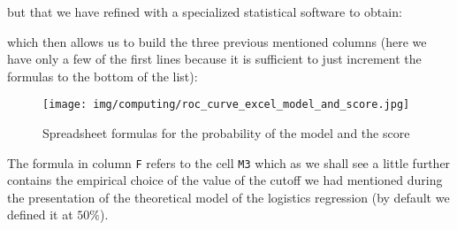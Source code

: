 	but that we have refined with a specialized statistical software to obtain:
	
	which then allows us to build the three previous mentioned columns (here we have only a few of the first lines because it is sufficient to just increment the formulas to the bottom of the list):
	\begin{figure}[H]
		\centering
		\texttt{[image: img/computing/roc\_curve\_excel\_model\_and\_score.jpg]}
		\caption{Spreadsheet formulas for the probability of the model and the score}
	\end{figure}
	The formula in column \texttt{F} refers to the cell \texttt{M3} which as we shall see a little further contains the empirical choice of the value of the cutoff we had mentioned during the presentation of the theoretical model of the logistics regression (by default we defined it at $50\%$).
	
